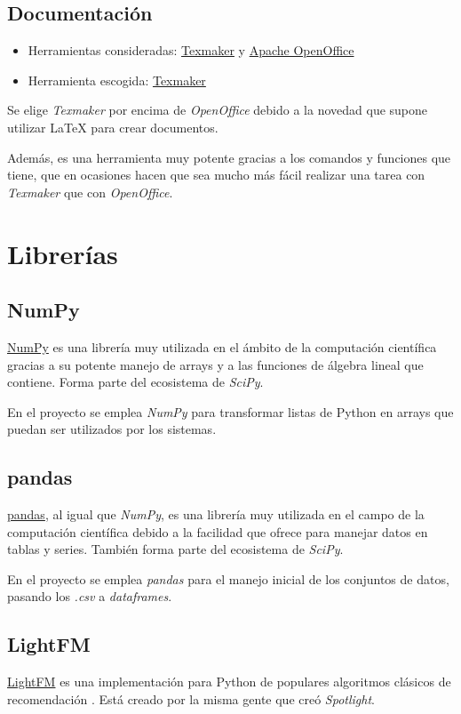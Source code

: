 \subsection{Documentación}\label{documentacion}
\begin{itemize}
\tightlist
\item Herramientas consideradas: 
	\href{http://www.xm1math.net/texmaker/}{Texmaker} y
	\href{https://www.openoffice.org/es/}{Apache OpenOffice}
\item Herramienta escogida:
	\href{http://www.xm1math.net/texmaker/}{Texmaker}
\end{itemize}
Se elige \textit{Texmaker} por encima de \textit{OpenOffice} debido a la novedad que supone utilizar \LaTeX{} para crear documentos. 

Además, es una herramienta muy potente gracias a los comandos y funciones que tiene, que en ocasiones hacen que sea mucho más fácil realizar una tarea con \textit{Texmaker} que con \textit{OpenOffice}.

\section{Librerías}\label{librerias}
\subsection{NumPy}\label{numpy}
\href{http://www.numpy.org/}{NumPy} es una librería muy utilizada en el ámbito de la computación científica gracias a su potente manejo de arrays y a las funciones de álgebra lineal que contiene. Forma parte del ecosistema de \textit{SciPy}.

En el proyecto se emplea \textit{NumPy} para transformar listas de Python en arrays que puedan ser utilizados por los sistemas.

\subsection{pandas}\label{pandas}
\href{http://pandas.pydata.org/}{pandas}, al igual que \textit{NumPy}, es una librería muy utilizada en el campo de la computación científica debido a la facilidad que ofrece para manejar datos en tablas y series. También forma parte del ecosistema de \textit{SciPy}.

En el proyecto se emplea \textit{pandas} para el manejo inicial de los conjuntos de datos, pasando los \textit{.csv} a \textit{dataframes}.

\subsection{LightFM}\label{lightfm}
\href{https://github.com/lyst/lightfm}{LightFM} es una implementación para Python de populares algoritmos clásicos de recomendación \cite{kulalightfm}. Está creado por la misma gente que creó \textit{Spotlight}.

